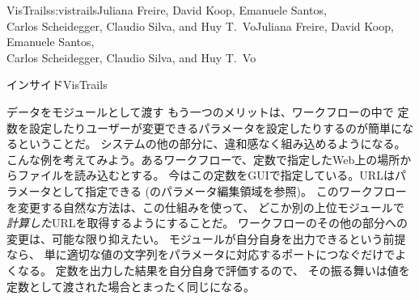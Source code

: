 \begin{aosachaptertoc}{VisTrails}{s:vistrails}{Juliana Freire, David Koop, Emanuele Santos, \\ Carlos Scheidegger, Claudio Silva, and Huy T.\ Vo}{Juliana Freire, David Koop, Emanuele Santos, \\ \hspace*{0.9cm} Carlos Scheidegger, Claudio Silva, and Huy T.\ Vo}
\begin{aosasect1}{インサイドVisTrails}
\begin{aosasect2}{データをモジュールとして渡す}
もう一つのメリットは、ワークフローの中で
定数を設定したりユーザーが変更できるパラメータを設定したりするのが簡単になるということだ。
システムの他の部分に、違和感なく組み込めるようになる。
こんな例を考えてみよう。あるワークフローで、定数で指定したWeb上の場所からファイルを読み込むとする。
今はこの定数をGUIで指定している。URLはパラメータとして指定できる
(のパラメータ編集領域を参照)。
このワークフローを変更する自然な方法は、この仕組みを使って、
どこか別の上位モジュールで\emph{計算した}URLを取得するようにすることだ。
ワークフローのその他の部分への変更は、可能な限り抑えたい。
モジュールが自分自身を出力できるという前提なら、
単に適切な値の文字列をパラメータに対応するポートにつなぐだけでよくなる。
定数を出力した結果を自分自身で評価するので、
その振る舞いは値を定数として渡された場合とまったく同じになる。



\end{aosasect2}
\end{aosasect1}
\end{aosachaptertoc}
